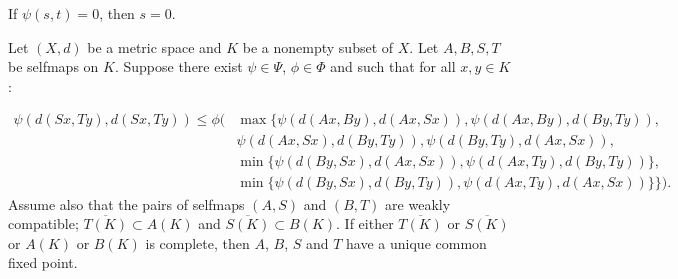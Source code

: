 \documentclass[10pt,a4paper]{amsart}
\begin{document}
\begin{remark} \label{rem:1.3}
If $\psi(s,t)=0$, then $s=0$.
\end{remark}

\begin{theorem}\label{thm:main}
Let $(X,d)$ be a metric space and $K$ be a nonempty subset of $X$. Let $A,B,S,T$ be selfmaps on $K$. Suppose there exist $\psi\in\Psi$, $\phi\in\Phi$ and such that for all $x,y\in K$:

\begin{align} \label{eq:2.1}
    \psi(d(Sx,Ty),d(Sx,Ty)) \leq \phi(&\max\{\psi(d(Ax,By),d(Ax,Sx)),\psi(d(Ax,By),d(By,Ty)),\nonumber \\
 &\psi(d(Ax,Sx),d(By,Ty)), \psi(d(By,Ty),d(Ax,Sx)),\\
 &\min\{\psi(d(By,Sx),d(Ax,Sx)),
\psi(d(Ax,Ty),d(By,Ty))\},  \nonumber\\
&\min\{\psi(d(By,Sx),d(By,Ty)), 
\psi(d(Ax,Ty),d(Ax,Sx))\}\}). \nonumber
\end{align}
Assume also that the pairs of selfmaps $(A,S)$ and $(B,T)$ are weakly compatible; $\overline{T(K)}\subset A(K)$ and $\overline{S(K)}\subset B(K)$. If either $\overline{T(K)}$ or $\overline{S(K)}$ or $A(K)$ or $B(K)$ is complete, then $A$, $B$, $S$ and $T$ have a unique common fixed point.
\end{theorem}
\end{document}
